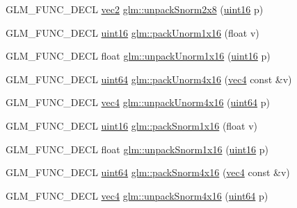 \begin{DoxyCompactItemize}
\item 
G\+L\+M\+\_\+\+F\+U\+N\+C\+\_\+\+D\+E\+CL \hyperlink{group__core__types_gaa1618f51db67eaa145db101d8c8431d8}{vec2} \hyperlink{group__gtc__packing_ga27f30f0281b88e152b0895f5e2ead878}{glm\+::unpack\+Snorm2x8} (\hyperlink{group__gtc__type__precision_gad8c2939e1fdd8e5828b31d95c52255d5}{uint16} p)
\item 
G\+L\+M\+\_\+\+F\+U\+N\+C\+\_\+\+D\+E\+CL \hyperlink{group__gtc__type__precision_gad8c2939e1fdd8e5828b31d95c52255d5}{uint16} \hyperlink{group__gtc__packing_ga60c7d915f5653559ae02c2f79a8c5c1d}{glm\+::pack\+Unorm1x16} (float v)
\item 
G\+L\+M\+\_\+\+F\+U\+N\+C\+\_\+\+D\+E\+CL float \hyperlink{group__gtc__packing_ga7770e3ade4f4764cc1b2eb42ac4ec188}{glm\+::unpack\+Unorm1x16} (\hyperlink{group__gtc__type__precision_gad8c2939e1fdd8e5828b31d95c52255d5}{uint16} p)
\item 
G\+L\+M\+\_\+\+F\+U\+N\+C\+\_\+\+D\+E\+CL \hyperlink{group__gtc__type__precision_gae3632bf9b37da66233d78930dd06378a}{uint64} \hyperlink{group__gtc__packing_gac561f06c908b7302537a8ef29fcb409e}{glm\+::pack\+Unorm4x16} (\hyperlink{group__core__types_ga5881b1b022d7fd1b7218f5916532dd02}{vec4} const \&v)
\item 
G\+L\+M\+\_\+\+F\+U\+N\+C\+\_\+\+D\+E\+CL \hyperlink{group__core__types_ga5881b1b022d7fd1b7218f5916532dd02}{vec4} \hyperlink{group__gtc__packing_gafb2b502bc406031a5618ce930139a9e3}{glm\+::unpack\+Unorm4x16} (\hyperlink{group__gtc__type__precision_gae3632bf9b37da66233d78930dd06378a}{uint64} p)
\item 
G\+L\+M\+\_\+\+F\+U\+N\+C\+\_\+\+D\+E\+CL \hyperlink{group__gtc__type__precision_gad8c2939e1fdd8e5828b31d95c52255d5}{uint16} \hyperlink{group__gtc__packing_gac29411d6c0f6ed0fe9f0396dfe92e0e8}{glm\+::pack\+Snorm1x16} (float v)
\item 
G\+L\+M\+\_\+\+F\+U\+N\+C\+\_\+\+D\+E\+CL float \hyperlink{group__gtc__packing_ga246f451cebf590726324f7a283e3d65e}{glm\+::unpack\+Snorm1x16} (\hyperlink{group__gtc__type__precision_gad8c2939e1fdd8e5828b31d95c52255d5}{uint16} p)
\item 
G\+L\+M\+\_\+\+F\+U\+N\+C\+\_\+\+D\+E\+CL \hyperlink{group__gtc__type__precision_gae3632bf9b37da66233d78930dd06378a}{uint64} \hyperlink{group__gtc__packing_ga9b237d7c66b7a71964e6d1f4dc06539f}{glm\+::pack\+Snorm4x16} (\hyperlink{group__core__types_ga5881b1b022d7fd1b7218f5916532dd02}{vec4} const \&v)
\item 
G\+L\+M\+\_\+\+F\+U\+N\+C\+\_\+\+D\+E\+CL \hyperlink{group__core__types_ga5881b1b022d7fd1b7218f5916532dd02}{vec4} \hyperlink{group__gtc__packing_ga1bfaa3f217fd7a4b6b9d3117ecb3fcac}{glm\+::unpack\+Snorm4x16} (\hyperlink{group__gtc__type__precision_gae3632bf9b37da66233d78930dd06378a}{uint64} p)

\end{DoxyCompactItemize}
